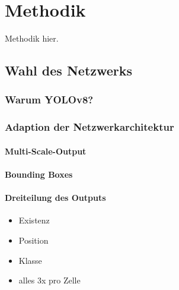 
\section{Methodik}
\label{sec:ki:methodik}

Methodik hier.

\subsection{Wahl des Netzwerks}
\label{sec:netzwerk_wahl}


\subsubsection{Warum YOLOv8?}
\label{sec:warum_yolov8}


\subsubsection{Adaption der Netzwerkarchitektur}
\label{sec:yolo_adaption}

\paragraph{Multi-Scale-Output}

\paragraph{Bounding Boxes}

\paragraph{Dreiteilung des Outputs}

\begin{itemize}
    \item Existenz
    \item Position
    \item Klasse
    \item alles 3x pro Zelle
\end{itemize}

